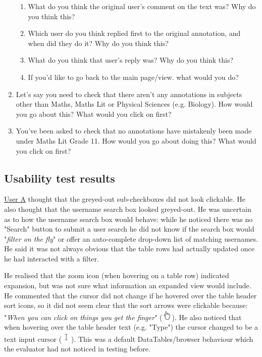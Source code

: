 \begin{enumerate}
\begin{enumerate}
 \item What do you think the original user's comment on the text was? Why do you think this?
 \item Which user do you think replied first to the original annotation, and when did they do it? Why do you think this?
 \item What do you think that user's reply was? Why do you think this?
 \item If you'd like to go back to the main page/view. what would you do?
 \end{enumerate}
 \item Let's say you need to check that there aren't any annotations in subjects other than Maths, Maths Lit or Physical Sciences (e.g. Biology). How would you go about this? What would you click on first?
 \item You've been asked to check that no annotations have mistakenly been made under Maths Lit Grade 11. How would you go about doing this? What would you click on first? 
 \end{enumerate}
 

\subsection{Usability test results}
\underline{User A} thought that the greyed-out sub-checkboxes did not look clickable. He also thought that the username search box looked greyed-out. He was uncertain as to how the username search box would behave: while he noticed there was no "Search" button to submit a user search he did not know if the search box would "\textit{filter on the fly}" or offer an auto-complete drop-down list of matching usernames. He said it was not always obvious that the table rows had actually updated once he had interacted with a filter.

He realised that the zoom icon (when hovering on a table row) indicated expansion, but was not sure what information an expanded view would include. He commented that the cursor did not change if he hovered over the table header sort icons, so it did not seem clear that the sort arrows were clickable because: "\textit{When you can click on things you get the finger}" (\includegraphics[width=0.5cm]{Figures/handcursor.png}). He also noticed that when hovering over the table header text (e.g. "Type") the cursor changed to be a text input cursor (\includegraphics[width=0.5cm]{Figures/textcursor.png}). This was a default DataTables/browser behaviour which the evaluator had not noticed in testing before.

